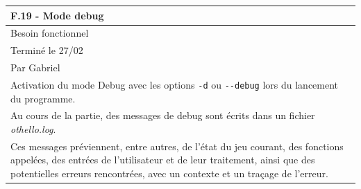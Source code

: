 \documentclass[a4paper,12pt]{article}
\begin{document}
\noindent
\setlength{\arrayrulewidth}{1.5pt}
\renewcommand{\arraystretch}{1.5}
\begin{tabularx}{\textwidth}{|X|}
    \hline
    \textbf{F.19 - Mode debug}                                                                                                                                                                                                                \\
    \hline
    Besoin fonctionnel                                                                                                                                                                                                                        \\
    \hline
    Terminé le 27/02                                                                                                                                                                                                                          \\
    Par Gabriel                                                                                                                                                                                                                               \\
    \hline
    Activation du mode Debug avec les options \texttt{-d} ou \texttt{-}\texttt{-debug} lors du lancement du programme.                                                                                                                        \\
    Au cours de la partie, des messages de debug sont écrits dans un fichier \textit{othello.log}.                                                                                                                                            \\
    Ces messages préviennent, entre autres, de l’état du jeu courant, des fonctions appelées, des entrées de l’utilisateur et de leur traitement, ainsi que des potentielles erreurs rencontrées, avec un contexte et un traçage de l’erreur. \\


\end{tabularx}
\end{document}
